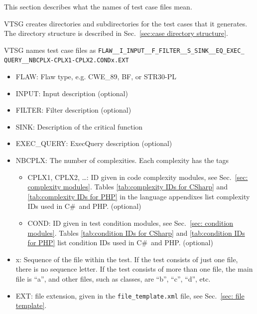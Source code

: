 \documentclass[12pt]{article}
\newcommand{\CSharp}{C{\fontseries{b}\selectfont\#}}
\begin{document}
This section describes what the
names of test case files mean.

VTSG creates directories and subdirectories for the test cases that it generates.
The directory structure is described in
Sec.~\ref{sec:case directory structure}.

\label{sec:case file name}

VTSG names test case files as
\verb|FLAW__I_INPUT__F_FILTER__S_SINK__EQ_EXEC_| \\
\verb|QUERY__NBCPLX-CPLX1-CPLX2.CONDx.EXT|
\begin{itemize}
    \item FLAW: Flaw type, e.g. CWE\_89, BF, or STR30-PL
    \item INPUT:  Input description (optional)
    \item FILTER:  Filter description (optional)
    \item SINK:  Description of the critical function
    \item EXEC\_QUERY:  ExecQuery description (optional)
    
    \item NBCPLX:  The number of complexities. Each complexity has the tags 
    \begin{itemize}
        \item CPLX1, CPLX2, \ldots: ID given in 
            code complexity modules, 
            see Sec.~\ref{sec: complexity modules}.
            Tables \ref{tab:complexity IDs for CSharp} and
            \ref{tab:complexity IDs for PHP} in the language appendixes list
            complexity IDs used in \CSharp\ and PHP.
            (optional)
        \item COND: ID given in test condition modules,
            see Sec.~\ref{sec: condition modules}.
            Tables \ref{tab:condition IDs for CSharp} and
            \ref{tab:condition IDs for PHP} list condition
            IDs used in \CSharp\ and PHP. (optional)
    \end{itemize}
    \item x: Sequence of the file within the test.  If the test consists of just one
      file, there is no sequence letter.  If the test consists of more than one file,
      the main file is ``a'', and other files, such as classes, are ``b'', ``c'',
      ``d'', etc.
    \item EXT: file extension, given in the \verb|file_template.xml| file, see
    Sec.~\ref{sec: file template}.
\end{itemize}
\end{document}
